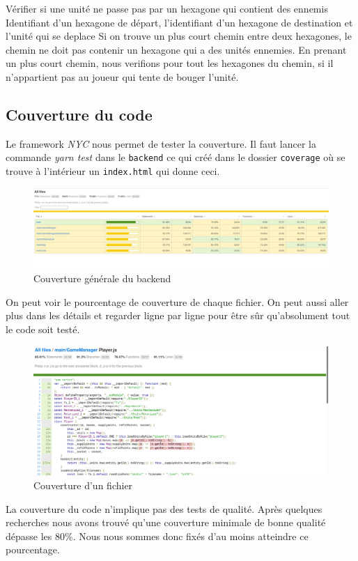 \mytest
{Vérifier si une unité ne passe pas par un hexagone qui contient des ennemis}
{Identifiant d'un hexagone de départ, l'identifiant d'un hexagone de destination et l'unité qui se deplace}
{Si on trouve un plus court chemin entre deux hexagones, le chemin ne doit pas contenir un hexagone qui a des
unités ennemies.}
{En prenant un plus court chemin, nous verifions pour tout les hexagones du chemin, si il n'appartient pas
au joueur qui tente de bouger l'unité.}

\subsection{Couverture du code}

Le framework \emph{NYC} nous permet de tester la couverture. Il faut lancer la commande \emph{yarn test} dans le \lstinline{backend} ce qui créé dans le dossier \lstinline{coverage} où se trouve à l'intérieur un \lstinline{index.html} qui donne ceci.

\begin{figure}[H]
    \centering
    \includegraphics[scale=0.35]{data/couverture_test_1.jpg}
    \caption{Couverture générale du backend}
\end{figure}

On peut voir le pourcentage de couverture de chaque fichier. On peut aussi aller plus dans les détails et regarder ligne par ligne pour être sûr qu'absolument tout le code soit testé.

\begin{figure}[H]
    \centering
    \includegraphics[scale=0.3]{data/couverture_test_2.png}
    \caption{Couverture d'un fichier}
\end{figure}

La couverture du code n'implique pas des tests de qualité. Après quelques recherches nous avons trouvé qu'une couverture minimale de bonne qualité dépasse les 80\%. Nous nous sommes donc fixés d'au moins atteindre ce pourcentage.